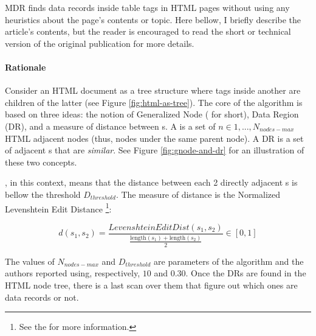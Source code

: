 \documentclass[10pt]{article}
\newcommand{\maxnodes}{N_{nodes-max}}
\newcommand{\dth}{D_{threshold}}
\newcommand{\gn}{\path{GNode}}
\begin{document}
MDR finds data records inside table tags in HTML pages without using any heuristics about the page's contents or topic. Here bellow, I briefly describe the article's contents, but the reader is encouraged to read the short \citep{mdr} or technical \citep{mdr-technical} version of the original publication for more details.


\paragraph{Rationale}

Consider an HTML document as a tree structure where tags inside another are children of the latter (see Figure \ref{fig:html-as-tree}). The core of the algorithm is based on three ideas: the notion of Generalized Node (\gn{}  for short), Data Region (DR), and a measure of distance between \gn{} s. A \gn{}  is a set of $n \in {1, ..., \maxnodes}$ HTML adjacent nodes (thus, nodes under the same parent node). A DR is a set of adjacent \gn{} s that are \emph{similar}. See Figure \ref{fig:gnode-and-dr} for an illustration of these two concepts.

, in this context, means that the distance between each 2 directly adjacent \gn{} s is bellow the threshold $\dth$. The measure of distance is the Normalized Levenshtein Edit Distance \footnote{See the \cite{lev-dist-wiki} for more information.}:

\begin{equation}\label{eq:dist}
    d\left(s_{1}, s_{2}\right)=\frac{LevenshteinEditDist\left(s_{1}, s_{2}\right)}{\frac{\text {length}\left(s_{1}\right)+\text {length}\left(s_{2}\right)}{2}} \in [0, 1]
\end{equation}

The values of $\maxnodes$ and $\dth$ are parameters of the algorithm and the authors reported using, respectively, $10$ and $0.30$. Once the DRs are found in the HTML node tree, there is a last scan over them that figure out which ones are data records or not.
\end{document}
